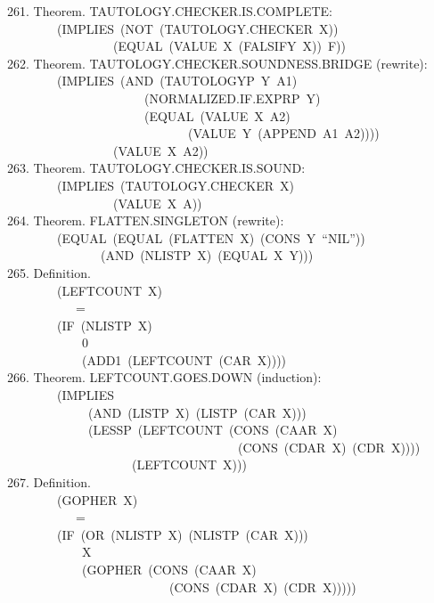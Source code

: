 \documentclass[10pt]{book}
\newenvironment{pubasis}{\begin{flushleft}}{\end{flushleft}}
\begin{document}
\begin{pubasis}
261.    Theorem.  TAUTOLOGY.CHECKER.IS.COMPLETE:\\
~~~~~~~~(IMPLIES~(NOT~(TAUTOLOGY.CHECKER~X))\\
~~~~~~~~~~~~~~~~~(EQUAL~(VALUE~X~(FALSIFY~X))~F))\\

262.    Theorem.  TAUTOLOGY.CHECKER.SOUNDNESS.BRIDGE (rewrite):\\
~~~~~~~~(IMPLIES~(AND~(TAUTOLOGYP~Y~A1)\\
~~~~~~~~~~~~~~~~~~~~~~(NORMALIZED.IF.EXPRP~Y)\\
~~~~~~~~~~~~~~~~~~~~~~(EQUAL~(VALUE~X~A2)\\
~~~~~~~~~~~~~~~~~~~~~~~~~~~~~(VALUE~Y~(APPEND~A1~A2))))\\
~~~~~~~~~~~~~~~~~(VALUE~X~A2))\\

263.    Theorem.  TAUTOLOGY.CHECKER.IS.SOUND:\\
~~~~~~~~(IMPLIES~(TAUTOLOGY.CHECKER~X)\\
~~~~~~~~~~~~~~~~~(VALUE~X~A))\\

264.    Theorem.  FLATTEN.SINGLETON (rewrite):\\
~~~~~~~~(EQUAL~(EQUAL~(FLATTEN~X)~(CONS~Y~``NIL''))\\
~~~~~~~~~~~~~~~(AND~(NLISTP~X)~(EQUAL~X~Y)))\\

265.    Definition.\\
~~~~~~~~(LEFTCOUNT~X)\\
~~~~~~~~~~~=\\
~~~~~~~~(IF~(NLISTP~X)\\
~~~~~~~~~~~~0\\
~~~~~~~~~~~~(ADD1~(LEFTCOUNT~(CAR~X))))\\

266.    Theorem.  LEFTCOUNT.GOES.DOWN (induction):\\
~~~~~~~~(IMPLIES\\
~~~~~~~~~~~~~(AND~(LISTP~X)~(LISTP~(CAR~X)))\\
~~~~~~~~~~~~~(LESSP~(LEFTCOUNT~(CONS~(CAAR~X)\\
~~~~~~~~~~~~~~~~~~~~~~~~~~~~~~~~~~~~~(CONS~(CDAR~X)~(CDR~X))))\\
~~~~~~~~~~~~~~~~~~~~(LEFTCOUNT~X)))\\

267.    Definition.\\
~~~~~~~~(GOPHER~X)\\
~~~~~~~~~~~=\\
~~~~~~~~(IF~(OR~(NLISTP~X)~(NLISTP~(CAR~X)))\\
~~~~~~~~~~~~X\\
~~~~~~~~~~~~(GOPHER~(CONS~(CAAR~X)\\
~~~~~~~~~~~~~~~~~~~~~~~~~~(CONS~(CDAR~X)~(CDR~X)))))\\


\end{pubasis}
\end{document}
